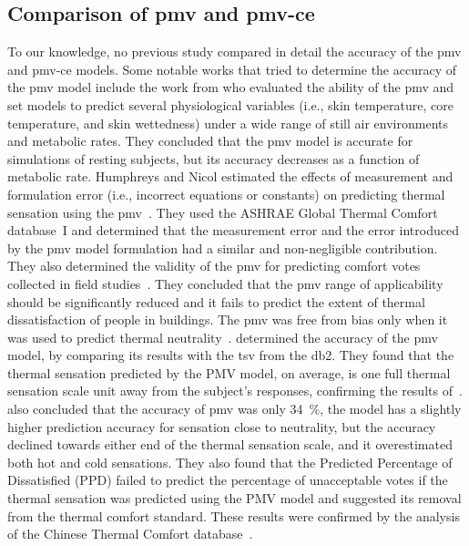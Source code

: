 \subsection{Comparison of \ac{pmv} and \ac{pmv-ce}}\label{subsec:comparision-of-pmv-formulations}
To our knowledge, no previous study compared in detail the accuracy of the \ac{pmv} and \ac{pmv-ce} models.
Some notable works that tried to determine the accuracy of the \ac{pmv} model include the work from  who evaluated the ability of the \ac{pmv} and \ac{set} models to predict several physiological variables (i.e., skin temperature, core temperature, and skin wettedness) under a wide range of still air environments and metabolic rates.
They concluded that the \ac{pmv} model is accurate for simulations of resting subjects, but its accuracy decreases as a function of metabolic rate.
Humphreys and Nicol estimated the effects of measurement and formulation error (i.e., incorrect equations or constants) on predicting thermal sensation using the \ac{pmv}~\cite{Humphreys2000}.
They used the ASHRAE Global Thermal Comfort database~I and determined that the measurement error and the error introduced by the \ac{pmv} model formulation had a similar and non-negligible contribution.
They also determined the validity of the \ac{pmv} for predicting comfort votes collected in field studies~\cite{Humphreys2002}.
They concluded that the \ac{pmv} range of applicability should be significantly reduced and it fails to predict the extent of thermal dissatisfaction of people in buildings.
The \ac{pmv} was free from bias only when it was used to predict thermal neutrality~\cite{Humphreys2002}.
 determined the accuracy of the \ac{pmv} model, by comparing its results with the \ac{tsv} from the \ac{db2}.
They found that the thermal sensation predicted by the PMV model, on average, is one full thermal sensation scale unit away from the subject’s responses, confirming the results of~.
 also concluded that the accuracy of \ac{pmv} was only \qty{34}{\percent}, the model has a slightly higher prediction accuracy for sensation close to neutrality, but the accuracy declined towards either end of the thermal sensation scale, and it overestimated both hot and cold sensations.
They also found that the Predicted Percentage of Dissatisfied (PPD) failed to predict the percentage of unacceptable votes if the thermal sensation was predicted using the PMV model and suggested its removal from the thermal comfort standard.
These results were confirmed by the analysis of the Chinese Thermal Comfort database~\cite{du_evaluation_2022}.
